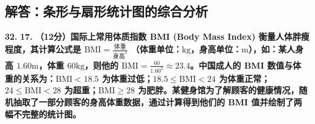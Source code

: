 \newpage

\newpage

\subsection{解答：条形与扇形统计图的综合分析}

\vspace{0.6cm}

\textbf{\LARGE 32.} \textbf{\color{cyan!80!blue} 17. }\textbf{（12分）国际上常用体质指数 BMI (Body Mass Index) 衡量人体胖瘦程度，其计算公式是 $\text{BMI} = \frac{\text{体重}}{\text{身高}^2}$ （体重单位：$\mathrm{kg}$，身高单位：$\mathrm{m}$），如：某人身高 $1.60\mathrm{m}$，体重 $60\mathrm{kg}$，则他的 $\text{BMI} = \frac{60}{1.60^2} \approx 23.4$。中国成人的 BMI 数值与体重的关系为：$\text{BMI} < 18.5$ 为体重过低；$18.5 \leqslant \text{BMI} < 24$ 为体重正常；$24 \leqslant \text{BMI} < 28$ 为超重；$\text{BMI} \geqslant 28$ 为肥胖。某健身馆为了解顾客的健康情况，随机抽取了一部分顾客的身高体重数据，通过计算得到他们的 BMI 值并绘制了两幅不完整的统计图。}

